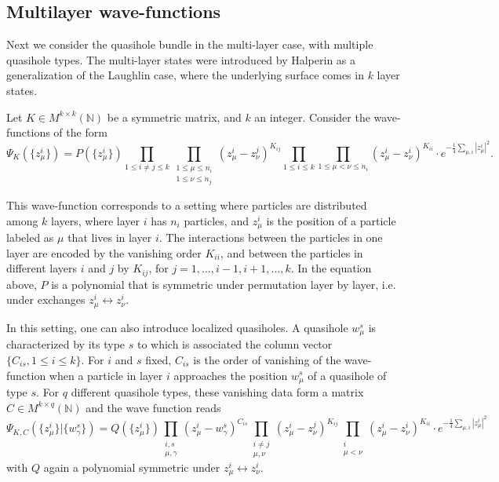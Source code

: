 \documentclass{article}
\theoremstyle{definition}
\renewcommand{\leq}{\leqslant}
\begin{document}
\subsection{Multilayer wave-functions}

Next we consider the quasihole bundle in the multi-layer case, with multiple quasihole types.
The multi-layer states were  introduced by Halperin \cite{Halperin_1984} as a generalization of the Laughlin case, where the underlying surface comes in $k$ layer states. 

Let $K\in M^{k\times k}(\mathbb{N})$ be a symmetric matrix, and $k$ an integer. Consider the wave-functions of the form  
\begin{equation}\label{eq:Halperin_wavefunctions}
    \Psi_K(\lbrace z^i_\mu \rbrace)=P(\lbrace z_\mu^i \rbrace )\prod_{1\leq i\neq  j \leq k}\prod_{\substack{1\leq \mu \leq n_i \\ 1 \leq \nu \leq n_j}} (z_\mu^i-z_\nu^j)^{K_{ij}}\prod_{1\leq i \leq k}\prod_{1\leq \mu<\nu \leq n_i}(z_\mu^i-z_\nu^i)^{K_{ii}}\cdot e^{-\frac{1}{4}\sum_{\mu, i}|z_\mu^i|^2}.
\end{equation}

This wave-function corresponds to a setting where particles are distributed among $k$ layers, where layer $i$ has $n_i$ particles, and $z_\mu^i$ is the position of a particle labeled as $\mu$ that lives in layer $i$.  The interactions between the particles in one layer are encoded by the vanishing order $K_{ii}$, and between the particles in different layers $i$ and $j$ by $K_{ij}$, for $j=1,\dots,i-1,i+1,\dots,k$. In the equation above, $P$ is a polynomial that is symmetric under permutation layer by layer, i.e. under exchanges $z^i_\mu \leftrightarrow z^i_\nu$.

In this setting, one can also introduce localized quasiholes. A quasihole $w_\mu^s$ is characterized by its type $s$ to which is associated the column vector $\lbrace C_{is},1\leq i \leq k \rbrace$. For $i$ and $s$ fixed, $C_{is}$ is the order of vanishing of the wave-function when a particle in layer $i$ approaches the position $w_\mu^s$ of a quasihole of type $s$. For $q$ different quasihole types, these vanishing data form a matrix $C\in M^{k\times q}(\mathbb{N})$ and the wave function reads
\begin{equation}\label{eq:Halperin_wavefunctionsqh}
    \Psi_{K,C} (\{ z^i_\mu \} | \{ w^s_\gamma \} )=Q(\lbrace z_\mu^i \rbrace )\prod_{\substack{i,s\\ \mu,\gamma}} (z_\mu^i-w_\gamma^s)^{C_{is}} \prod_{\substack{i\neq  j\\\mu,\nu}}(z_\mu^i-z_\nu^j)^{K_{ij}}\prod_{\substack{i\\\mu<\nu}}(z_\mu^i-z_\nu^i)^{K_{ii}}\cdot e^{-\frac{1}{4}\sum_{\mu, i}|z_\mu^i|^2}
\end{equation}
with $Q$ again a polynomial symmetric under $z^i_\mu \leftrightarrow z^i_\nu$.
\end{document}
